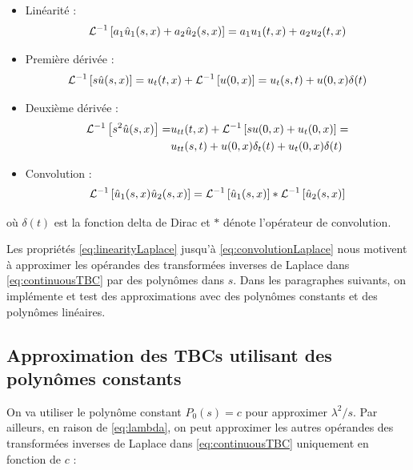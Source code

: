 \begin{itemize}
	\item Linéarité :
		\begin{equation}
			\label{eq:linearityLaplace}
				\mathcal{L}^{-1} \left[a_1\hat{u}_1(s,x) + a_2\hat{u}_2(s,x)\right] = a_1u_1(t,x) + a_2u_2(t,x)
		\end{equation}
	\item Première dérivée : 
		\begin{equation}
			\label{eq:firstDerivativeLaplace}
			\mathcal{L}^{-1} \left[ s\hat{u}(s,x) \right] = u_t(t,x) + \mathcal{L}^{-1} \left[ u(0,x) \right] =  u_t(s,t) +  u(0,x) \delta (t)
		\end{equation}
	\item Deuxième dérivée : 
		\begin{equation}
			\label{eq:secondDerivativeLaplace}
			\begin{aligned}
			\mathcal{L}^{-1} \left[ s^2\hat{u}(s,x) \right] = & u_{tt}(t,x) + \mathcal{L}^{-1} \left[ su(0,x) + u_{t}(0,x)\right] = \\
																		   & u_{tt}(s,t) + u(0,x)\delta_t(t) +  u_t(0,x)\delta (t)
			\end{aligned}
		\end{equation}
	\item Convolution :
	\begin{equation}
		\label{eq:convolutionLaplace}
		\mathcal{L}^{-1} \left[ \hat{u}_1(s,x)\hat{u}_2(s,x)\right] = \mathcal{L}^{-1} \left[ \hat{u}_1(s,x)\right] * \mathcal{L}^{-1} \left[ \hat{u}_2(s,x)\right]
	\end{equation}
\end{itemize} 

\noindent où $\delta (t)$ est la fonction delta de Dirac et $*$ dénote l'opérateur de convolution.

\indent Les propriétés \eqref{eq:linearityLaplace} jusqu'à \eqref{eq:convolutionLaplace} nous motivent à approximer les opérandes des transformées inverses de Laplace dans \eqref{eq:continuousTBC} par des polynômes dans $s$. Dans les paragraphes suivants, on implémente et test des approximations avec des polynômes constants et des polynômes linéaires.

\subsection{Approximation des TBCs utilisant des polynômes constants}

\indent On va utiliser le polynôme constant $P_0(s) = c$  pour approximer $\lambda^2/s$. Par ailleurs, en raison de \eqref{eq:lambda}, on peut approximer les autres opérandes des transformées inverses de Laplace dans \eqref{eq:continuousTBC} uniquement en fonction de $c$ :

